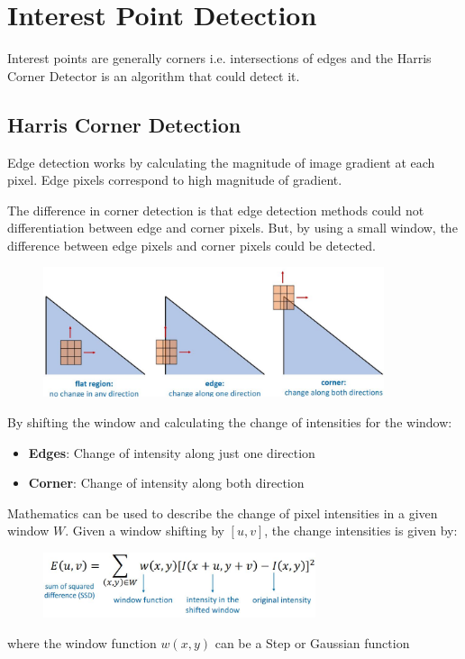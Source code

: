 \documentclass{report}
\begin{document}
\section{Interest Point Detection}

Interest points are generally corners i.e. intersections of edges and the Harris Corner Detector is an
algorithm that could detect it.

\subsection{Harris Corner Detection}

Edge detection works by calculating the magnitude of image gradient at each
pixel. Edge pixels correspond to high magnitude of gradient.

The difference in corner detection is that edge detection methods could not
differentiation between edge and corner pixels. But, by using a small window,
the difference between edge pixels and corner pixels could be detected. 
\begin{figure}[h]
    \centering
    \includegraphics[width=10cm]{window dection.JPG}
\end{figure}

By shifting the window and calculating the change of intensities for the window:
\begin{itemize}
    \item \textbf{Edges}: Change of intensity along just one direction 
    \item \textbf{Corner}: Change of intensity along both direction
\end{itemize}

\pagebreak

Mathematics can be used to describe the change of pixel intensities in a given
window $W$. Given a window shifting by $[u, v]$, the change intensities is given by:
\begin{figure}[h]
    \centering
    \includegraphics[width=8cm]{Harris math.JPG}
\end{figure}
where the window function $w(x,y)$ can be a Step or Gaussian function  
\end{document}
